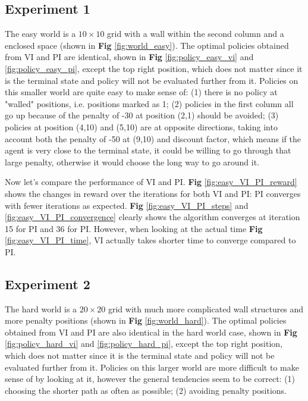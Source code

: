 \documentclass[10pt]{article}
\begin{document}


\subsection{Experiment 1} \label{experiment1}

The easy world is a $10\times10$ grid with a wall within the second column and a enclosed space (shown in \textbf{Fig} \ref{fig:world_easy}). The optimal policies obtained from VI and PI are identical, shown in \textbf{Fig} \ref{fig:policy_easy_vi} and \ref{fig:policy_easy_pi}, except the top right position, which does not matter since it is the terminal state and policy will not be evaluated further from it. Policies on this smaller world are quite easy to make sense of: (1) there is no policy at "walled" positions, i.e. positions marked as 1; (2) policies in the first column all go up because of the penalty of -30 at position (2,1) should be avoided; (3) policies at position (4,10) and (5,10) are at opposite directions, taking into account both the penalty of -50 at (9,10) and discount factor, which means if the agent is very close to the terminal state, it could be willing to go through that large penalty, otherwise it would choose the long way to go around it.\par

Now let's compare the performance of VI and PI. \textbf{Fig} \ref{fig:easy_VI_PI_reward} shows the changes in reward over the iterations for both VI and PI: PI converges with fewer iterations as expected. \textbf{Fig} \ref{fig:easy_VI_PI_steps} and \ref{fig:easy_VI_PI_convergence} clearly shows the algorithm converges at iteration 15 for PI and 36 for PI. However, when looking at the actual time \textbf{Fig} \ref{fig:easy_VI_PI_time}, VI actually takes shorter time to converge compared to PI.




\subsection{Experiment 2} \label{experiment2}

The hard world is a $20\times20$ grid with much more complicated wall structures and more penalty positions (shown in \textbf{Fig} \ref{fig:world_hard}). The optimal policies obtained from VI and PI are also identical in the hard world case, shown in \textbf{Fig} \ref{fig:policy_hard_vi} and \ref{fig:policy_hard_pi}, except the top right position, which does not matter since it is the terminal state and policy will not be evaluated further from it. Policies on this larger world are more difficult to make sense of by looking at it, however the general tendencies seem to be correct: (1) choosing the shorter path as often as possible; (2) avoiding penalty positions.\par
\end{document}
